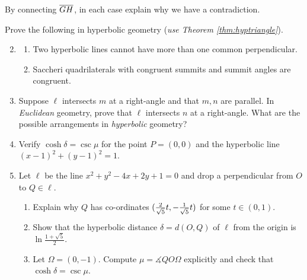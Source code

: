 \begin{exercises}
\begin{enumerate}
\begin{minipage}[t]{0.39\linewidth}
	  \end{minipage}\medbreak
	  By connecting $\overline{GH}$, in each case explain why we have a contradiction.
	\end{enumerate}
\end{exercises}


\iffalse
\begin{exercises}
	\exstart Prove the following in hyperbolic geometry (\emph{use Theorem \ref{thm:hyptriangle}}).\par\vspace{-2pt}
	\begin{enumerate}\setcounter{enumi}{1}
	  \item[]\begin{enumerate}
	    \item Two hyperbolic lines cannot have more than one common perpendicular.
	    \item\label{exs:saccherisummitcong} Saccheri quadrilaterals with congruent summits and summit angles are congruent.
	  \end{enumerate}
	   
	  
	  \item Suppose $\ell$ intersects $m$ at a right-angle and that $m,n$ are parallel. In \emph{Euclidean} geometry, prove that $\ell$ intersects $n$ at a right-angle. What are the possible arrangements in \emph{hyperbolic} geometry?
	  
	  
	  \item Verify $\cosh\delta=\csc\mu$ for the point $P=(0,0)$ and the hyperbolic line $(x-1)^2+(y-1)^2=1$.
	  
	  
	  \item Let $\ell$ be the line $x^2+y^2-4x+2y+1=0$ and drop a perpendicular from $O$ to $Q\in\ell$.
	  \begin{enumerate}
	    \item Explain why $Q$ has co-ordinates $(\smash{\frac 2{\sqrt 5}t,-\frac 1{\sqrt 5}t})$ for some $t\in(0,1)$.
	    \item Show that the hyperbolic distance $\delta=d(O,Q)$ of $\ell$ from the origin is $\ln\frac{1+\sqrt 5}2$.
	    \item Let $\Omega=(0,-1)$. Compute $\mu=\measuredangle QO\Omega$ explicitly and check that $\cosh\delta=\csc\mu$.
		\end{enumerate}
		

\end{enumerate}
\end{exercises}

